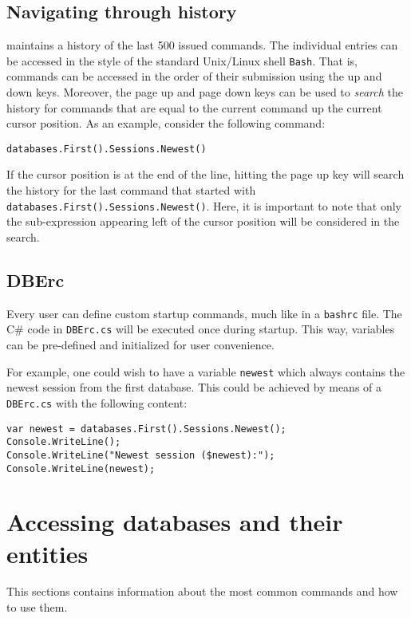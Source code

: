 \subsection{Navigating through history}
\BoSSSpad{} maintains a history of the last 500 issued commands. The individual entries can be accessed in the style of the standard Unix/Linux shell \lstinline{Bash}. That is, commands can be accessed in the order of their submission using the up and down keys. Moreover, the page up and page down keys can be used to \emph{search} the history for commands that are equal to the current command up the current cursor position. As an example, consider the following command:
\begin{lstlisting}[title=Example history search]
databases.First().Sessions.Newest()
\end{lstlisting}
If the cursor position is at the end of the line, hitting the page up key will search the history for the last command that started with \lstinline{databases.First().Sessions.Newest()}. Here, it is important to note that only the sub-expression appearing left of the cursor position will be considered in the search. 


\subsection{DBErc}
\label{sec:dberec}
Every user can define custom startup commands, much like in a \lstinline{bashrc} file. The C\# code in \lstinline{DBErc.cs} will be executed once during \BoSSSpad{} startup. This way, variables can be pre-defined and initialized for user convenience.

For example, one could wish to have a variable \lstinline{newest} which always contains the newest session from the first database. This could be achieved by means of a \lstinline{DBErc.cs} with the following content:

\begin{lstlisting}[title=Example DBErc.cs]
var newest = databases.First().Sessions.Newest();
Console.WriteLine();
Console.WriteLine("Newest session ($newest):");
Console.WriteLine(newest);
\end{lstlisting}


\section{Accessing databases and their entities}
This sections contains information about the most common commands and how to use them.

